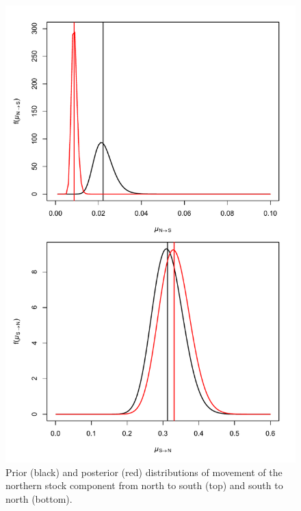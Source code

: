 \documentclass[
]{article}
\begin{document}
\begin{figure}

{\centering \includegraphics[width=1\linewidth]{move_prior_post} 

}

\caption{Prior (black) and posterior (red) distributions of movement of the northern stock component from north to south (top) and south to north (bottom).}\label{fig:move-prior-posterior}
\end{figure}
\pagebreak
\end{document}
